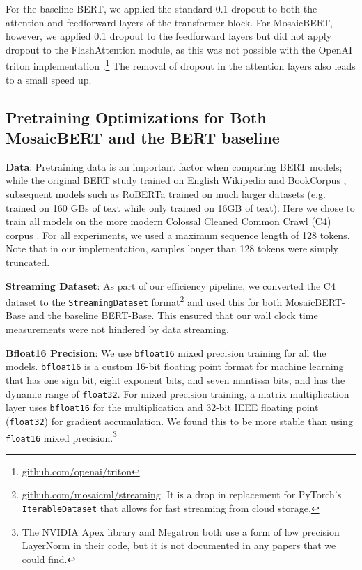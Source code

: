 \documentclass{article}
\begin{document}
For the baseline BERT, we applied the standard 0.1 dropout to both the attention and feedforward layers of the transformer block. For MosaicBERT, however, we applied 0.1 dropout to the feedforward layers but did not apply dropout to the FlashAttention module, as this was not possible with the OpenAI triton implementation \citep{tillet2019triton}.\footnote{\href{https://github.com/openai/triton}{\url{github.com/openai/triton}}} The removal of dropout in the attention layers also leads to a small speed up.







\subsection{Pretraining Optimizations for Both MosaicBERT and the BERT baseline}


\textbf{Data}: Pretraining data is an important factor when comparing BERT models; while the original BERT study trained on English Wikipedia and BookCorpus \citep{zhu2015aligning}, subsequent models such as RoBERTa trained on much larger datasets (e.g. \cite{liu2019roberta} trained on 160 GBs of text while \cite{devlin2018bert} only trained on 16GB of text). Here we chose to train all models on the more modern Colossal Cleaned Common Crawl (C4) corpus \citep{raffel2020exploring}. For all experiments, we used a maximum sequence length of 128 tokens. Note that in our implementation, samples longer than 128 tokens were simply truncated.


\textbf{Streaming Dataset}: As part of our efficiency pipeline, we converted the C4 dataset to the \texttt{StreamingDataset} format\footnote{\href{https://github.com/mosaicml/streaming}{\url{github.com/mosaicml/streaming}}. It is a drop in replacement for PyTorch's \texttt{IterableDataset} that allows for fast streaming from cloud storage.} and used this for both MosaicBERT-Base and the baseline BERT-Base. This ensured that our wall clock time measurements were not hindered by data streaming.



\textbf{Bfloat16 Precision}:
We use \texttt{bfloat16} mixed precision training for all the models. \texttt{bfloat16} is a custom 16-bit floating point format for machine learning that has one sign bit, eight exponent bits, and seven mantissa bits, and has the dynamic range of \texttt{float32}. For mixed precision training, a matrix multiplication layer uses \texttt{bfloat16} for the multiplication and 32-bit IEEE floating point (\texttt{float32}) for gradient accumulation. We found this to be more stable than using \texttt{float16} mixed precision.\footnote{The NVIDIA Apex library and Megatron \citep{shoeybi2019megatron} both use a form of low precision LayerNorm in their code, but it is not documented in any papers that we could find.}
\end{document}
